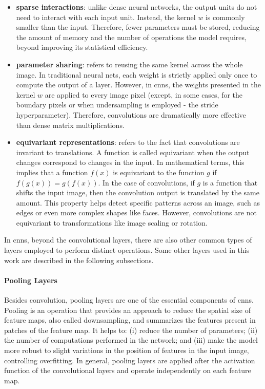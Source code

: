 \begin{itemize}
\item \textbf{sparse interactions}: unlike dense neural networks, the output units do not need to interact with each input unit. Instead, the kernel $w$ is commonly smaller than the input. Therefore, fewer parameters must be stored, reducing the amount of memory and the number of operations the model requires, beyond improving its statistical efficiency.

\item \textbf{parameter sharing}: refers to reusing the same kernel across the whole image. In traditional neural nets, each weight is strictly applied only once to compute the output of a layer. However, in \acsp{cnn}, the weights presented in the kernel $w$ are applied to every image pixel (except, in some cases, for the boundary pixels or when  undersampling is employed - the stride hyperparameter). Therefore, convolutions are dramatically more effective than dense matrix multiplications.

\item \textbf{equivariant representations}: refers to the fact that convolutions are invariant to translations. A function is called equivariant when the output changes correspond to changes in the input. In mathematical terms, this implies that a function $f(x)$ is equivariant to the function $g$ if $f(g(x)) = g(f(x))$. In the case of convolutions, if $g$ is a function that shifts the input image, then the convolution output is translated by the same amount. This property helps detect specific patterns across an image, such as edges or even more complex shapes like faces. However, convolutions are not equivariant to transformations like image scaling or rotation.
\end{itemize}

In \aclp{cnn}, beyond the convolutional layers, there are also other common types of layers employed to perform distinct operations. Some other layers used in this work are described in the following subsections.

\paragraph{Pooling Layers}

Besides convolution, pooling layers are one of the essential components of \aclp{cnn}. Pooling is an operation that provides an approach to reduce the spatial size of feature maps, also called downsampling, and summarizes the features present in patches of the feature map. It helps to: (i) reduce the number of parameters; (ii) the number of computations performed in the network; and (iii) make the model more robust to slight variations in the position of features in the input image, controlling overfitting. In general, pooling layers are applied after the activation function of the convolutional layers and operate independently on each feature map.

